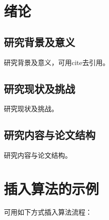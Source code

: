 \documentclass[openany,oneside]{book}
\begin{document}
	
	\frontmatter
	\sloppy %
	
	
	
	
	\tableofcontents
	{\xiaosi}
	\clearpage{\pagestyle{empty}\cleardoublepage}
	
	\mainmatter
	
	\chapter{绪论}
	\section{研究背景及意义}
	
	研究背景及意义，可用cite去引用。\cite{dean2008mapreduce}
	
	\lipsum
	
	\section{研究现状及挑战}
	
	研究现状及挑战。
	
	\section{研究内容与论文结构}
	
	研究内容与论文结构。
	
	\chapter{插入算法的示例}
	
	可用如下方式插入算法流程：
	
\end{document}
